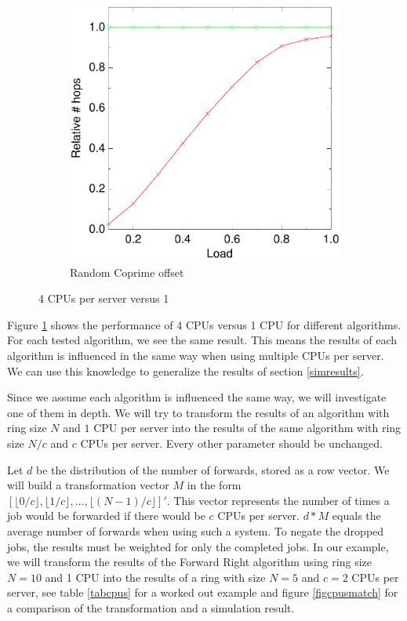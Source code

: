 \documentclass[10pt,a4paper]{article}
\begin{document}
\begin{figure}
        \begin{subfigure}[b]{0.5\textwidth}
                \centering
                \includegraphics[width=\textwidth]{data/4randprimerandprime.pdf}
                \caption{Random Coprime offset}
        \end{subfigure}
        \caption{4 CPUs per server versus 1}\label{figcpus}
\end{figure}

Figure \ref{figcpus} shows the performance of 4 CPUs versus 1 CPU for different algorithms. For each tested algorithm, we see the same result. This means the results of each algorithm is influenced in the same way when using multiple CPUs per server. We can use this knowledge to generalize the results of section \ref{simresults}.

Since we assume each algorithm is influenced the same way, we will investigate one of them in depth. We will try to transform the results of an algorithm with ring size $N$ and $1$ CPU per server into the results of the same algorithm with ring size $N/c$ and $c$ CPUs per server. Every other parameter should be unchanged.

Let $d$ be the distribution of the number of forwards, stored as a row vector. We will build a transformation vector $M$ in the form $[ \lfloor 0/c \rfloor,  \lfloor 1/c \rfloor, \ldots, \lfloor (N-1)/c \rfloor]'$. This vector represents the number of times a job would be forwarded if there would be $c$ CPUs per server. $d*M$ equals the average number of forwards when using such a system. To negate the dropped jobs, the results must be weighted for only the completed jobs.
In our example, we will transform the results of the Forward Right algorithm using ring size $N=10$ and 1 CPU into the results of a ring with size $N=5$ and $c=2$ CPUs per server, see table \ref{tabcpus} for a worked out example and figure \ref{figcpusmatch} for a comparison of the transformation and a simulation result.
\end{document}
